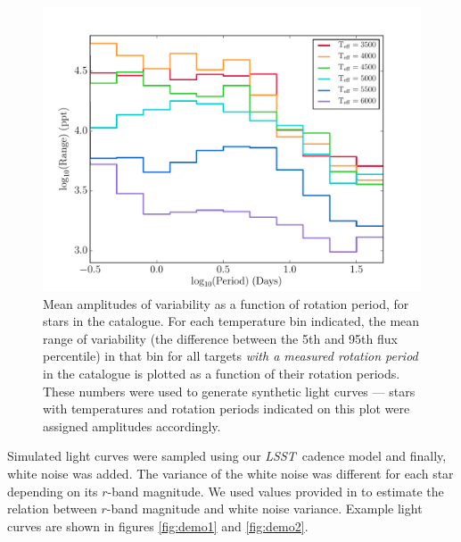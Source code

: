 \documentclass[useAMS, usenatbib, preprint, 12pt]{aastex}
\newcommand{\LSST}{{\it LSST}}
\begin{document}
\begin{figure}
\begin{center}
\includegraphics[width=6in, clip=true]{figures/amp_hist.pdf}
\caption[The mean amplitudes of variability for stars in the
\citet{Mcquillan2014} catalogue, according to their temperatures.]
{Mean amplitudes of variability as a function of rotation period, for stars
in the \citet{Mcquillan2014} catalogue.
For each temperature bin indicated, the mean range of variability (the
difference between the 5th and 95th flux percentile) in that bin for all
targets {\it with a measured rotation period} in the \citet{Mcquillan2014}
catalogue is plotted as a function of their rotation periods.
These numbers were used to generate synthetic light curves --- stars with
temperatures and rotation periods indicated on this plot were assigned
amplitudes accordingly.
}
\label{fig:amp_hist}
\end{center}
\end{figure}

Simulated light curves were sampled using our \LSST\ cadence model and
finally, white noise was added.
The variance of the white noise was different for each star depending on
its $r$-band magnitude.
We used values provided in \citet{Jacklin2015} to estimate the relation
between $r$-band magnitude and white noise variance.
Example light curves are shown in figures \ref{fig:demo1} and
\ref{fig:demo2}.
\end{document}
